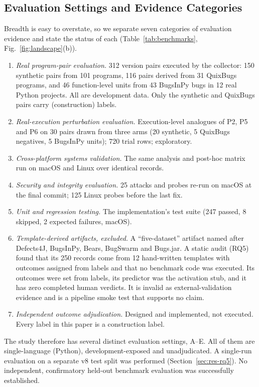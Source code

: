 \subsection{Evaluation Settings and Evidence Categories}
Breadth is easy to overstate, so we separate seven categories of evaluation evidence and state the status of each (Table~\ref{tab:benchmarks}, Fig.~\ref{fig:landscape}(b)).
\begin{enumerate}
\item[A)] \emph{Real program-pair evaluation.} 312 version pairs executed by the collector: 150 synthetic pairs from 101 programs, 116 pairs derived from 31 QuixBugs programs, and 46 function-level units from 43 BugsInPy bugs in 12 real Python projects. All are development data. Only the synthetic and QuixBugs pairs carry (construction) labels.
\item[B)] \emph{Real-execution perturbation evaluation.} Execution-level analogues of P2, P5 and P6 on 30 pairs drawn from three arms (20 synthetic, 5 QuixBugs negatives, 5 BugsInPy units); 720 trial rows; exploratory.
\item[C)] \emph{Cross-platform systems validation.} The same analysis and post-hoc \ers{} matrix run on macOS and Linux over identical records.
\item[D)] \emph{Security and integrity evaluation.} 25 attacks and probes re-run on macOS at the final commit; 125 Linux probes before the last fix.
\item[E)] \emph{Unit and regression testing.} The implementation's test suite (247 passed, 8 skipped, 2 expected failures, macOS).
\item[F)] \emph{Template-derived artifacts, excluded.} A ``five-dataset'' artifact named after Defects4J, BugsInPy, Bears, BugSwarm and Bugs.jar. A static audit (RQ5) found that its 250 records come from 12 hand-written templates with outcomes assigned from labels and that no benchmark code was executed. Its outcomes were set from labels, its predictor was the activation stub, and it has zero completed human verdicts. It is invalid as external-validation evidence and is a pipeline smoke test that supports no claim.
\item[G)] \emph{Independent outcome adjudication.} Designed and implemented, not executed. Every label in this paper is a construction label.
\end{enumerate}
The study therefore has several distinct evaluation settings, A--E. All of them are single-language (Python), development-exposed and unadjudicated. A single-run evaluation on a separate v8 test split was performed (Section~\ref{sec:res-rq5}). No independent, confirmatory held-out benchmark evaluation was successfully established.

